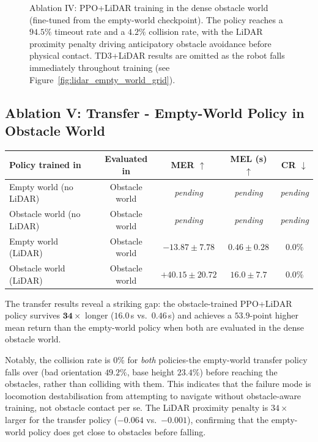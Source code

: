 \documentclass{article}
\begin{document}
\begin{figure}[H]
    \caption{
    Ablation IV: PPO+LiDAR training in the dense obstacle world (fine-tuned from
    the empty-world checkpoint). The policy reaches a $94.5\%$ timeout rate and
    a $4.2\%$ collision rate, with the LiDAR proximity penalty driving anticipatory
    obstacle avoidance before physical contact.
    TD3+LiDAR results are omitted as the robot falls immediately throughout
    training (see Figure~\ref{fig:lidar_empty_world_grid}).
    }
    \label{fig:ppo_lidar_obstacle_world_grid}
\end{figure}

\subsection{Ablation V: Transfer - Empty-World Policy in Obstacle World}

\begin{center}
\begin{tabular}{lcccc}
  \toprule
  \textbf{Policy trained in} & \textbf{Evaluated in}
    & \textbf{MER} $\uparrow$ & \textbf{MEL (s)} $\uparrow$ & \textbf{CR} $\downarrow$ \\
  \midrule
  Empty world (no LiDAR)    & Obstacle world & \textit{pending} & \textit{pending} & \textit{pending} \\
  Obstacle world (no LiDAR) & Obstacle world & \textit{pending} & \textit{pending} & \textit{pending} \\
  Empty world (LiDAR)       & Obstacle world & $-13.87 \pm 7.78$ & $0.46 \pm 0.28$ & $0.0\%$ \\
  Obstacle world (LiDAR)    & Obstacle world & $+40.15 \pm 20.72$ & $16.0 \pm 7.7$ & $0.0\%$ \\
  \bottomrule
\end{tabular}
\end{center}

The transfer results reveal a striking gap: the obstacle-trained PPO+LiDAR
policy survives $\mathbf{34\times}$ longer ($16.0$\,s vs.\ $0.46$\,s) and
achieves a $\mathbf{53.9}$-point higher mean return than the empty-world
policy when both are evaluated in the dense obstacle world.

Notably, the collision rate is $0\%$ for \emph{both} policies-the
empty-world transfer policy falls over (bad orientation $49.2\%$, base height
$23.4\%$) before reaching the obstacles, rather than colliding with them.
This indicates that the failure mode is locomotion destabilisation from
attempting to navigate without obstacle-aware training, not obstacle contact
per se.
The LiDAR proximity penalty is $34\times$ larger for the transfer policy
($-0.064$ vs.\ $-0.001$), confirming that the empty-world policy does get
close to obstacles before falling.
\end{document}
